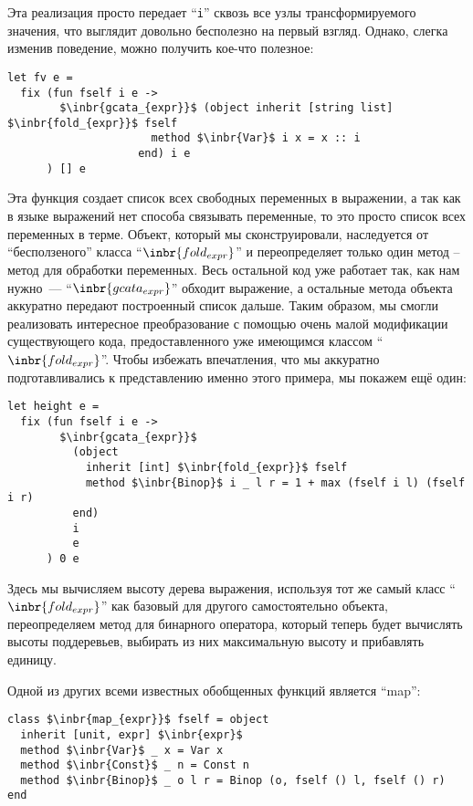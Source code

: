 Эта реализация просто передает ``\lstinline{i}'' сквозь все узлы трансформируемого значения, что выглядит довольно бесполезно на первый взгляд.
Однако, слегка изменив поведение, можно получить кое-что полезное:

\begin{lstlisting}
let fv e =
  fix (fun fself i e ->
        $\inbr{gcata_{expr}}$ (object inherit [string list] $\inbr{fold_{expr}}$ fself
                      method $\inbr{Var}$ i x = x :: i
                    end) i e
      ) [] e
\end{lstlisting}

Эта функция создает список всех свободных переменных в выражении, а так как в языке выражений нет способа связывать переменные, 
то это просто список всех переменных в терме. Объект, который мы сконструировали, наследуется от ``бесползеного'' класса ``$\inbr{fold_{expr}}$'' и переопределяет только один метод -- метод для обработки переменных.
Весь остальной код уже работает так, как нам нужно~--- ``$\inbr{gcata_{expr}}$'' обходит выражение, 
а остальные метода объекта аккуратно передают построенный список дальше.
Таким образом, мы смогли реализовать интересное преобразование с помощью очень малой модификации существующего кода, 
предоставленного уже имеющимся классом ``$\inbr{fold_{expr}}$''. Чтобы избежать впечатления, что мы аккуратно подготавливались к
представлению именно этого примера, мы покажем ещё один:

\begin{lstlisting}
let height e =
  fix (fun fself i e ->
        $\inbr{gcata_{expr}}$ 
          (object 
            inherit [int] $\inbr{fold_{expr}}$ fself
            method $\inbr{Binop}$ i _ l r = 1 + max (fself i l) (fself i r) 
          end) 
          i 
          e
      ) 0 e
\end{lstlisting}

Здесь мы вычисляем высоту дерева выражения, используя тот же самый класс ``$\inbr{fold_{expr}}$'' как базовый для другого самостоятельно объекта, переопределяем метод для бинарного оператора, который теперь будет вычислять высоты поддеревьев, выбирать из них максимальную высоту и прибавлять единицу.

Одной из других всеми известных обобщенных функций является ``map'':

\begin{lstlisting}
class $\inbr{map_{expr}}$ fself = object 
  inherit [unit, expr] $\inbr{expr}$
  method $\inbr{Var}$ _ x = Var x
  method $\inbr{Const}$ _ n = Const n
  method $\inbr{Binop}$ _ o l r = Binop (o, fself () l, fself () r)
end
\end{lstlisting}

